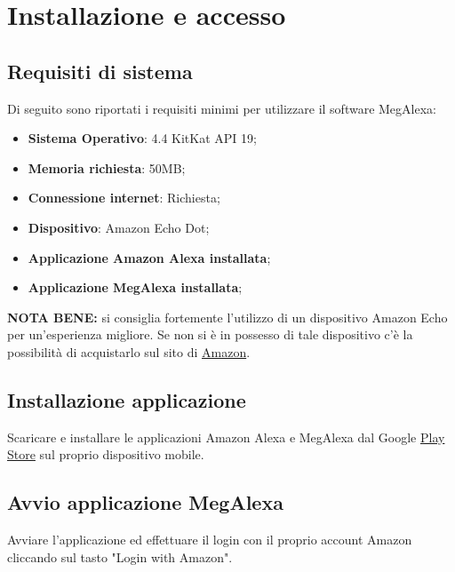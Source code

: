 \chapter{Installazione e accesso}


\section{Requisiti di sistema}
\label{Requisiti sistema}
Di seguito sono riportati i requisiti minimi per utilizzare il software MegAlexa:

\begin{itemize}
	\item \textbf{Sistema Operativo}:  4.4 KitKat API 19;
	\item \textbf{Memoria richiesta}: 50MB;
	\item \textbf{Connessione internet}: Richiesta;
	\item \textbf{Dispositivo}: Amazon Echo Dot;
	\item \textbf{Applicazione Amazon Alexa installata};
	\item \textbf{Applicazione MegAlexa installata};
\end{itemize}

\textbf{NOTA BENE:} si consiglia fortemente l'utilizzo di un dispositivo Amazon Echo per un'esperienza migliore. Se non si è in possesso di tale dispositivo c'è la possibilità di acquistarlo sul sito di \href{https://www.amazon.it}{Amazon}.

\section{Installazione applicazione}
Scaricare e installare le applicazioni Amazon Alexa e MegAlexa dal Google \href{https://play.google.com/store/apps?hl=it}{Play Store} sul proprio dispositivo mobile.
\newpage
\section{Avvio applicazione MegAlexa}
\label{Installazione MegAlexa}
Avviare l'applicazione ed effettuare il login con il proprio account Amazon cliccando sul tasto "Login with Amazon".

